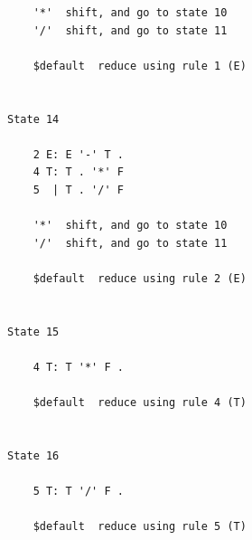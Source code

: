 \begin{verbatim}
    '*'  shift, and go to state 10
    '/'  shift, and go to state 11

    $default  reduce using rule 1 (E)


State 14

    2 E: E '-' T .
    4 T: T . '*' F
    5  | T . '/' F

    '*'  shift, and go to state 10
    '/'  shift, and go to state 11

    $default  reduce using rule 2 (E)


State 15

    4 T: T '*' F .

    $default  reduce using rule 4 (T)


State 16

    5 T: T '/' F .

    $default  reduce using rule 5 (T)
\end{verbatim}

